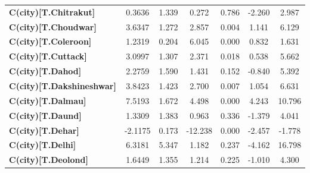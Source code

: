 \begin{center}
\begin{tabular}{lcccccc}
\textbf{C(city)[T.Chitrakut]}                                                                       &       0.3636  &        1.339     &     0.272  &         0.786        &       -2.260    &        2.987     \\
\textbf{C(city)[T.Choudwar]}                                                                        &       3.6347  &        1.272     &     2.857  &         0.004        &        1.141    &        6.129     \\
\textbf{C(city)[T.Coleroon]}                                                                        &       1.2319  &        0.204     &     6.045  &         0.000        &        0.832    &        1.631     \\
\textbf{C(city)[T.Cuttack]}                                                                         &       3.0997  &        1.307     &     2.371  &         0.018        &        0.538    &        5.662     \\
\textbf{C(city)[T.Dahod]}                                                                           &       2.2759  &        1.590     &     1.431  &         0.152        &       -0.840    &        5.392     \\
\textbf{C(city)[T.Dakshineshwar]}                                                                   &       3.8423  &        1.423     &     2.700  &         0.007        &        1.054    &        6.631     \\
\textbf{C(city)[T.Dalmau]}                                                                          &       7.5193  &        1.672     &     4.498  &         0.000        &        4.243    &       10.796     \\
\textbf{C(city)[T.Daund]}                                                                           &       1.3309  &        1.383     &     0.963  &         0.336        &       -1.379    &        4.041     \\
\textbf{C(city)[T.Dehar]}                                                                           &      -2.1175  &        0.173     &   -12.238  &         0.000        &       -2.457    &       -1.778     \\
\textbf{C(city)[T.Delhi]}                                                                           &       6.3181  &        5.347     &     1.182  &         0.237        &       -4.162    &       16.798     \\
\textbf{C(city)[T.Deolond]}                                                                         &       1.6449  &        1.355     &     1.214  &         0.225        &       -1.010    &        4.300     \\

\end{tabular}
\end{center}
